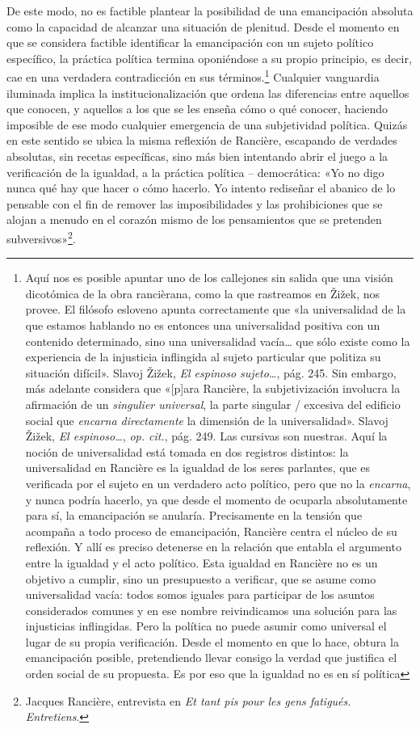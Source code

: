 De este modo, no es factible plantear la posibilidad de una emancipación absoluta como la capacidad de alcanzar una situación de plenitud. Desde el momento en que se considera factible identificar la emancipación con un sujeto político específico, la práctica política termina oponiéndose a su propio principio, es decir, cae en una verdadera contradicción en sus términos.\footnote{Aquí nos es posible apuntar uno de los callejones sin salida que una visión dicotómica de la obra rancièrana, como la que rastreamos en Žižek, nos provee. El filósofo esloveno apunta correctamente que «la universalidad de la que estamos hablando no es entonces una universalidad positiva con un contenido determinado, sino una universalidad vacía\ldots{} que sólo existe como la experiencia de la injusticia inflingida al sujeto particular que politiza su situación difícil». Slavoj Žižek, \emph{El espinoso sujeto\ldots{}}, pág. 245. Sin embargo, más adelante considera que «{[}p{]}ara Rancière, la subjetivización involucra la afirmación de un \emph{singulier universal}, la parte singular / excesiva del edificio social que \emph{encarna directamente} la dimensión de la universalidad». Slavoj Žižek, \emph{El espinoso\ldots{}}, \emph{op. cit.}, pág. 249. Las cursivas son nuestras. Aquí la noción de universalidad está tomada en dos registros distintos: la universalidad en Rancière es la igualdad de los seres parlantes, que es verificada por el sujeto en un verdadero acto político, pero que no la \emph{encarna}, y nunca podría hacerlo, ya que desde el momento de ocuparla absolutamente para sí, la emancipación se anularía. Precisamente en la tensión que acompaña a todo proceso de emancipación, Rancière centra el núcleo de su reflexión. Y allí es preciso detenerse en la relación que entabla el argumento entre la igualdad y el acto político. Esta igualdad en Rancière no es un objetivo a cumplir, sino un presupuesto a verificar, que se asume como universalidad vacía: todos somos iguales para participar de los asuntos considerados comunes y en ese nombre reivindicamos una solución para las injusticias inflingidas. Pero la política no puede asumir como universal el lugar de su propia verificación. Desde el momento en que lo hace, obtura la emancipación posible, pretendiendo llevar consigo la verdad que justifica el orden social de su propuesta. Es por eso que la igualdad no es en sí política} Cualquier vanguardia iluminada implica la institucionalización que ordena las diferencias entre aquellos que conocen, y aquellos a los que se les enseña cómo o qué conocer, haciendo imposible de ese modo cualquier emergencia de una subjetividad política. Quizás en este sentido se ubica la misma reflexión de Rancière, escapando de verdades absolutas, sin recetas específicas, sino más bien intentando abrir el juego a la verificación de la igualdad, a la práctica política -- democrática: «Yo no digo nunca qué hay que hacer o cómo hacerlo. Yo intento rediseñar el abanico de lo pensable con el fin de remover las imposibilidades y las prohibiciones que se alojan a menudo en el corazón mismo de los pensamientos que se pretenden subversivos»\footnote{Jacques Rancière, entrevista en \emph{Et tant pis pour les gens fatigués. Entretiens}.}.

